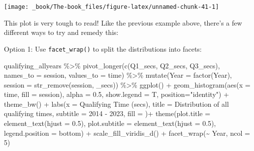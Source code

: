 \documentclass[
]{book}
\newenvironment{Shaded}{\begin{snugshade}}{\end{snugshade}}
\newcommand{\AttributeTok}[1]{\textcolor[rgb]{0.77,0.63,0.00}{#1}}
\newcommand{\DecValTok}[1]{\textcolor[rgb]{0.00,0.00,0.81}{#1}}
\newcommand{\FloatTok}[1]{\textcolor[rgb]{0.00,0.00,0.81}{#1}}
\newcommand{\FunctionTok}[1]{\textcolor[rgb]{0.00,0.00,0.00}{#1}}
\newcommand{\NormalTok}[1]{#1}
\newcommand{\SpecialCharTok}[1]{\textcolor[rgb]{0.00,0.00,0.00}{#1}}
\newcommand{\StringTok}[1]{\textcolor[rgb]{0.31,0.60,0.02}{#1}}
\begin{document}
\begin{center}\texttt{[image: \_book/The-book\_files/figure-latex/unnamed-chunk-41-1]} \end{center}

This plot is very tough to read! Like the previous example above, there's a few different ways to try and remedy this:

Option 1: Use \texttt{facet\_wrap()} to split the distributions into facets:

\begin{Shaded}
\begin{Highlighting}[]
\NormalTok{qualifying\_allyears }\SpecialCharTok{\%\textgreater{}\%}
  \FunctionTok{pivot\_longer}\NormalTok{(}\FunctionTok{c}\NormalTok{(}\StringTok{\textquotesingle{}Q1\_secs\textquotesingle{}}\NormalTok{, }\StringTok{\textquotesingle{}Q2\_secs\textquotesingle{}}\NormalTok{, }\StringTok{\textquotesingle{}Q3\_secs\textquotesingle{}}\NormalTok{),}
               \AttributeTok{names\_to =} \StringTok{\textquotesingle{}session\textquotesingle{}}\NormalTok{,}
               \AttributeTok{values\_to =} \StringTok{\textquotesingle{}time\textquotesingle{}}\NormalTok{) }\SpecialCharTok{\%\textgreater{}\%}
  \FunctionTok{mutate}\NormalTok{(}\AttributeTok{Year =} \FunctionTok{factor}\NormalTok{(Year),}
         \AttributeTok{session =} \FunctionTok{str\_remove}\NormalTok{(session, }\StringTok{\textquotesingle{}\_secs\textquotesingle{}}\NormalTok{)) }\SpecialCharTok{\%\textgreater{}\%}
  \FunctionTok{ggplot}\NormalTok{() }\SpecialCharTok{+}
  \FunctionTok{geom\_histogram}\NormalTok{(}\FunctionTok{aes}\NormalTok{(}\AttributeTok{x =}\NormalTok{ time, }\AttributeTok{fill =}\NormalTok{ session),}
                 \AttributeTok{alpha =} \FloatTok{0.5}\NormalTok{, }\AttributeTok{show.legend =}\NormalTok{ T,}
                 \AttributeTok{position=}\StringTok{"identity"}\NormalTok{) }\SpecialCharTok{+}
  \FunctionTok{theme\_bw}\NormalTok{() }\SpecialCharTok{+}
  \FunctionTok{labs}\NormalTok{(}\AttributeTok{x =} \StringTok{\textquotesingle{}Qualifying Time (secs)\textquotesingle{}}\NormalTok{,}
       \AttributeTok{title =} \StringTok{\textquotesingle{}Distribution of all qualifying times\textquotesingle{}}\NormalTok{,}
       \AttributeTok{subtitle =} \StringTok{\textquotesingle{}2014 {-} 2023\textquotesingle{}}\NormalTok{,}
       \AttributeTok{fill =} \StringTok{\textquotesingle{}\textquotesingle{}}\NormalTok{)}\SpecialCharTok{+}
  \FunctionTok{theme}\NormalTok{(}\AttributeTok{plot.title =} \FunctionTok{element\_text}\NormalTok{(}\AttributeTok{hjust =} \FloatTok{0.5}\NormalTok{),}
        \AttributeTok{plot.subtitle =} \FunctionTok{element\_text}\NormalTok{(}\AttributeTok{hjust =} \FloatTok{0.5}\NormalTok{),}
        \AttributeTok{legend.position =} \StringTok{\textquotesingle{}bottom\textquotesingle{}}\NormalTok{) }\SpecialCharTok{+}
  \FunctionTok{scale\_fill\_viridis\_d}\NormalTok{() }\SpecialCharTok{+}
  \FunctionTok{facet\_wrap}\NormalTok{(}\SpecialCharTok{\textasciitilde{}}\NormalTok{ Year, }\AttributeTok{ncol =} \DecValTok{5}\NormalTok{)}
\end{Highlighting}
\end{Shaded}
\end{document}
